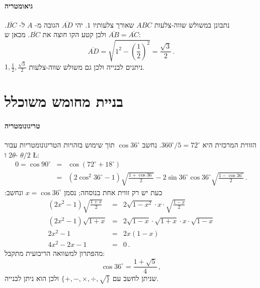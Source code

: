 \documentclass[11pt,a4paper]{article}
\newenvironment{form}[1]{%
\begin{displaymath}%
\renewcommand{\arraystretch}{#1}%
\begin{array}{lcl}}%
{\end{array}%
\end{displaymath}%
}
\newcommand*{\disfrac}[2]{\displaystyle\frac{#1}{#2}}
\begin{document}
\paragraph{גיאומטריה}
נתבונן במשולש שווה-צלעות
$ABC$
שאורך צלעותיו 
$1$.
יהי
$\overline{AD}$
הגובה מ-%
$A$
ל-%
$\overline{BC}$.
$\overline{AB}=\overline{AC}$
ולכן קטע הקו חוצה את
$\overline{BC}$.
מכאן ש:
\[
\overline{AD}= \sqrt{1^2-\left(\disfrac{1}{2}\right)^2}=\disfrac{\sqrt{3}}{2}\,.
\]
$1,\frac{1}{2},\frac{\sqrt{3}}{2}$
ניתנים לבנייה ולכן גם משולש שווה-צלעות.
\begin{center}
\end{center}


\section{בניית מחומש משוכלל}\label{a.pentagon}

\paragraph{טריגונומטריה}
הזווית המרכזית היא
$360^\circ/5=72^\circ$.
נחשב
$\cos 36^\circ$
תוך שימוש בזהויות הטריגונומטריות עבור
$2\theta$
ו-%
$\theta/2$
\L{\cite{wiki:pentagon}}:
\begin{form}{1.5}
0=\cos 90^\circ &=& \cos(72^\circ+18^\circ)\\
&=&(2\cos^2 36^\circ-1)\sqrt{\disfrac{1+\cos 36^\circ}{2}}-2\sin 36^\circ\cos 36^\circ\sqrt{\disfrac{1-\cos 36^\circ}{2}}\,.
\end{form}
כעת יש רק זווית אחת בנוסחה; נסמן
$x=\cos 36^\circ$ 
ונחשב:
\begin{form}{1.5}
(2x^2-1)\sqrt{\disfrac{1+x}{2}}&=&2\sqrt{1-x^2}\cdot x \cdot \sqrt{\disfrac{1-x}{2}}\\
(2x^2-1)\sqrt{1+x}&=&2\sqrt{1-x}\cdot\sqrt{1+x}\cdot x \cdot \sqrt{1-x}\\
2x^2-1&=&2x(1-x)\\
4x^2-2x-1&=&0\,.
\end{form}
מהפתרון למשוואה הריבועית מתקבל:
\[
\cos 36^\circ = \disfrac{1+\sqrt{5}}{4}\,,
\]
שניתן לחשב עם
$\{+,-,\times,\div,\surd\}$
ולכן הוא ניתן לבנייה.
\end{document}
